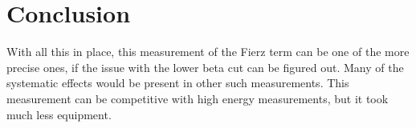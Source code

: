 \documentclass[main.tex]{subfiles}
\begin{document}
\section{Conclusion}
With all this in place, this measurement of the Fierz term can be one of the more precise ones, if the issue with the lower beta cut can be figured out.
Many of the systematic effects would be present in other such measurements.
This measurement can be competitive with high energy measurements, but it took much less equipment.
\end{document}

